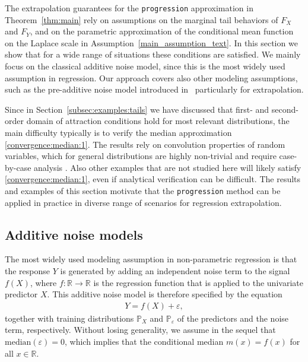 \documentclass{statsoc}
\theoremstyle{break}
\newcommand{\eps}{\varepsilon}
\renewcommand{\P}{\mathbb P}
\def\M{\text{median}}
\begin{document}
The extrapolation guarantees for the \texttt{progression} approximation in Theorem~\ref{thm:main} rely on assumptions on the marginal tail behaviors of $F_X$ and $F_Y$, and on the parametric approximation of the conditional mean function on the Laplace scale in Assumption~\ref{main_assumption_text}.
In this section we show that for a wide range of situations these conditions are satisfied. We mainly focus on the classical additive noise model, since this is the most widely used assumption in regression. Our approach covers also other modeling assumptions, such as the pre-additive noise model introduced in~\cite{shen:meinshausen:2023} particularly for extrapolation. 


Since in Section~\ref{subsec:examples:tails} we have discussed that first- and second- order domain of attraction conditions hold for most relevant distributions, the main difficulty typically is to verify the median approximation \eqref{convergence:median:1}. The results rely on convolution properties of random variables, which for general distributions are highly non-trivial and require case-by-case analysis \citep[e.g.,][]{EOW2019}. 
Also other examples that are not studied here will likely satisfy \eqref{convergence:median:1}, even if analytical verification can be difficult.
The results and examples of this section motivate that the \texttt{progression} method can be applied in practice in diverse range of scenarios for regression extrapolation. 



\subsection{Additive noise models}\label{sec:add_noise}

The most widely used modeling assumption in non-parametric regression is that the response $Y$ is generated by adding an independent noise term to the signal $f(X)$, where $f: \mathbb R \to \mathbb R$ is the regression function that is applied to the univariate predictor $X$. This additive noise model is therefore specified by the equation
\begin{align}\label{add_noise}
	Y = f(X) + \eps,
\end{align} 
together with training distributions $\P_X$ and $\P_\eps$ of the predictors and the noise term, respectively. Without losing generality, we assume in the sequel that $\M(\eps) = 0$, which implies that the conditional median $m(x) = f(x)$ for all $x\in\mathbb R$.
\end{document}
